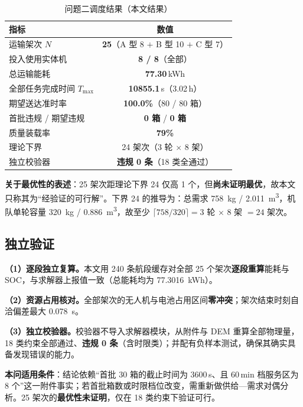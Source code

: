\begin{table}[htbp]
	\caption{问题二调度结果（本文结果）}
	\label{tab:q2result}
	\centering
	\begin{tabular}{lc}
		\toprule
		指标 & 数值 \\
		\midrule
		运输架次 $N$                & \textbf{25}（A 型 8 $+$ B 型 10 $+$ C 型 7） \\
		投入使用实体机              & \textbf{8 / 8}（全部） \\
		总运输能耗                  & \textbf{77.30}\,kWh \\
		全部任务完成时间 $T_{\max}$ & \textbf{10855.1}\,s（3.02\,h） \\
		期望送达准时率              & \textbf{100.0\%}（80 / 80 箱） \\
		首批违规 / 期望违规         & \textbf{0 箱} / \textbf{0 箱} \\
		质量装载率                  & \textbf{79\%} \\
		理论下界                    & 24 架次（3 轮 $\times$ 8 架） \\
		独立校验器                  & \textbf{违规 0 条}（18 类全通过） \\
		\bottomrule
	\end{tabular}
\end{table}

\textbf{关于最优性的表述}：25 架次距理论下界 24 仅高 1 个，但\textbf{尚未证明最优}，故本文只称其为“经验证的可行解”。下界 24 的推导为：总需求 \SI{758}{kg} / \SI{2.011}{m^3}，机队单轮容量 \SI{320}{kg} / \SI{0.886}{m^3}，故至少 $\lceil 758/320\rceil=3$ 轮 $\times$ 8 架 $=24$ 架次。

\subsection{独立验证}

\textbf{（1）逐段独立复算。}本文用 240 条航段缓存对全部 25 个架次\textbf{逐段重算}能耗与 SOC，与求解器上报值一致（总能耗均为 \SI{77.3016}{kWh}）。

\textbf{（2）资源占用核对。}全部架次的无人机与电池占用区间\textbf{零冲突}；架次结束时刻自洽偏差最大 \SI{0.078}{s}。

\textbf{（3）独立校验器。}校验器不导入求解器模块，从附件与 DEM 重算全部物理量，18 类约束全部通过、\textbf{违规 0 条}（含时限类）；并配有负样本测试，确保其确实具备发现错误的能力。

\textbf{本问适用条件}：结论依赖“首批 30 箱的截止时间为 3600\,s、且 60\,min 档服务区为 8 个”这一附件事实；若首批箱数或时限档位改变，需重新做供给—需求对偶分析。25 架次的\textbf{最优性未证明}，仅在 18 类约束下验证可行。
